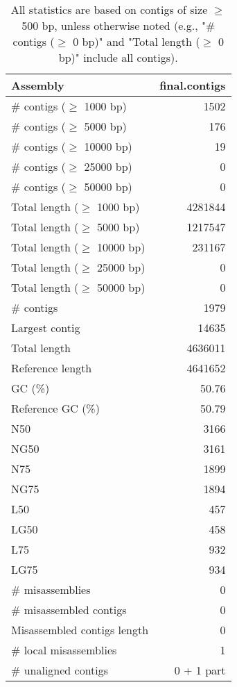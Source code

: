 \documentclass[12pt,a4paper]{article}
\begin{document}
\begin{table}[ht]
\begin{center}
\caption{All statistics are based on contigs of size $\geq$ 500 bp, unless otherwise noted (e.g., "\# contigs ($\geq$ 0 bp)" and "Total length ($\geq$ 0 bp)" include all contigs).}
\begin{tabular}{|l*{1}{|r}|}
\hline
Assembly & final.contigs \\ \hline
\# contigs ($\geq$ 1000 bp) & 1502 \\ \hline
\# contigs ($\geq$ 5000 bp) & 176 \\ \hline
\# contigs ($\geq$ 10000 bp) & 19 \\ \hline
\# contigs ($\geq$ 25000 bp) & 0 \\ \hline
\# contigs ($\geq$ 50000 bp) & 0 \\ \hline
Total length ($\geq$ 1000 bp) & 4281844 \\ \hline
Total length ($\geq$ 5000 bp) & 1217547 \\ \hline
Total length ($\geq$ 10000 bp) & 231167 \\ \hline
Total length ($\geq$ 25000 bp) & 0 \\ \hline
Total length ($\geq$ 50000 bp) & 0 \\ \hline
\# contigs & 1979 \\ \hline
Largest contig & 14635 \\ \hline
Total length & 4636011 \\ \hline
Reference length & 4641652 \\ \hline
GC (\%) & 50.76 \\ \hline
Reference GC (\%) & 50.79 \\ \hline
N50 & 3166 \\ \hline
NG50 & 3161 \\ \hline
N75 & 1899 \\ \hline
NG75 & 1894 \\ \hline
L50 & 457 \\ \hline
LG50 & 458 \\ \hline
L75 & 932 \\ \hline
LG75 & 934 \\ \hline
\# misassemblies & 0 \\ \hline
\# misassembled contigs & 0 \\ \hline
Misassembled contigs length & 0 \\ \hline
\# local misassemblies & 1 \\ \hline
\# unaligned contigs & 0 + 1 part \\ \hline

\end{tabular}
\end{center}
\end{table}
\end{document}
